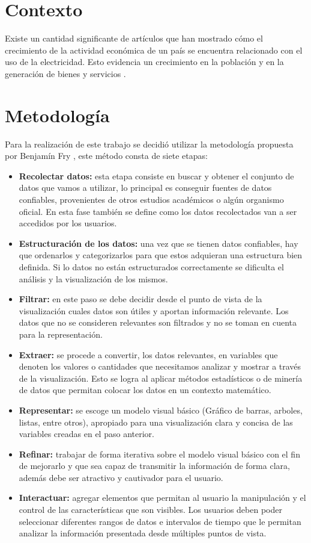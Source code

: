 \documentclass{article}
\begin{document}
\section{Contexto}

Existe un cantidad significante de artículos que han mostrado cómo el crecimiento  de la actividad económica de un país se encuentra relacionado con el uso de la electricidad. Esto evidencia un crecimiento en la población y en la generación de bienes y servicios \cite{chen_relationship_2007}. 



\section{Metodología }
Para la realización de este trabajo se decidió utilizar la metodología propuesta por Benjamín Fry \cite{fry2008visualizing}, este método consta de siete etapas:
\begin{itemize}
    \item \textbf{Recolectar datos:} esta etapa consiste en buscar y obtener el conjunto de datos que vamos a utilizar, lo principal es conseguir fuentes de datos confiables, provenientes de otros estudios académicos o algún organismo oficial. En esta fase también se define como los datos recolectados van a ser accedidos por los usuarios.
    \item \textbf{Estructuración de los datos:} una vez que se tienen datos confiables, hay que ordenarlos y categorizarlos para que estos adquieran una estructura bien definida. Si lo datos no están estructurados correctamente se dificulta el análisis y la visualización de los mismos.
    \item \textbf{Filtrar: }
    en este paso se debe decidir desde el punto de vista de la visualización cuales datos son útiles y aportan información relevante. Los datos que no se consideren relevantes son filtrados y no se toman en cuenta para la representación.
    \item \textbf{Extraer: }
    se procede a convertir, los datos relevantes, en variables que denoten los valores o cantidades que necesitamos analizar y mostrar a través de la visualización. Esto se logra al aplicar métodos estadísticos o de minería de datos que permitan colocar los datos en un contexto matemático.
    \item \textbf{Representar:}
    se escoge un modelo visual básico (Gráfico de barras, arboles, listas, entre otros), apropiado para una visualización clara y concisa de las variables creadas en el paso anterior.
    \item \textbf{Refinar: }
    trabajar de forma iterativa sobre el modelo visual básico con el fin de mejorarlo y que sea capaz de transmitir la información de forma clara, además debe ser atractivo y cautivador para el usuario.  
    \item \textbf{Interactuar: }
    agregar elementos que permitan al usuario la manipulación y el control de las características que son visibles. Los usuarios deben poder seleccionar diferentes rangos de datos e intervalos de tiempo que le permitan analizar la información presentada desde múltiples puntos de vista.  
\end{itemize}
\end{document}
